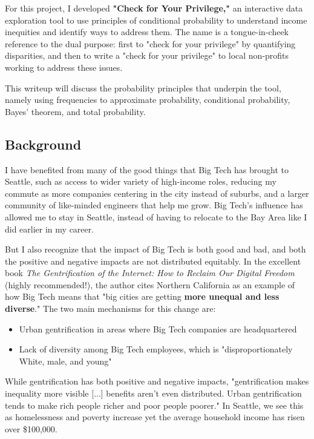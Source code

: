 \documentclass[11pt]{article}
\begin{document}
For this project, I developed \textbf{"Check for Your Privilege,"} an interactive data exploration tool to use principles of conditional probability to understand income inequities and identify ways to address them. The name is a tongue-in-cheek reference to the dual purpose: first to "check for your privilege" by quantifying disparities, and then to write a "check for your privilege" to local non-profits working to address these issues.

This writeup will discuss the probability principles that underpin the tool, namely using frequencies to approximate probability, conditional probability, Bayes' theorem, and total probability.

\subsection*{Background}

I have benefited from many of the good things that Big Tech has brought to Seattle, such as access to wider variety of high-income roles, reducing my commute as more companies centering in the city instead of suburbs, and a larger community of like-minded engineers that help me grow. Big Tech's influence has allowed me to stay in Seattle, instead of having to relocate to the Bay Area like I did earlier in my career.

But I also recognize that the impact of Big Tech is both good and bad, and both the positive and negative impacts are not distributed equitably. In the excellent book \textit{The Gentrification of the Internet: How to Reclaim Our Digital Freedom} (highly recommended!), the author cites Northern California as an example of how Big Tech means that "big cities are getting \textbf{more unequal and less diverse}."\cite{gentrification} The two main mechanisms for this change are:
\begin{itemize}
    \item Urban gentrification in areas where Big Tech companies are headquartered
    \item Lack of diversity among Big Tech employees, which is "disproportionately White, male, and young"\cite{gentrification}
\end{itemize}

While gentrification has both positive and negative impacts, "gentrification makes inequality more visible [...] benefits aren't even distributed. Urban gentrification tends to make rich people richer and poor people poorer." In Seattle, we see this as homelessness and poverty increase yet the average household income has risen over \$100,000.
\end{document}
